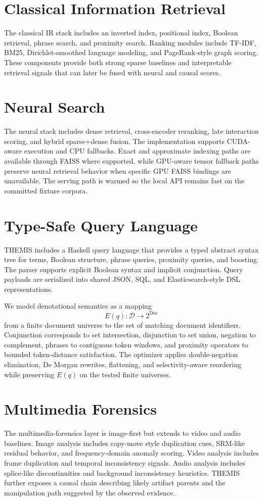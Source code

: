 \documentclass{article}
\begin{document}
\section{Classical Information Retrieval}
The classical IR stack includes an inverted index, positional index, Boolean retrieval, phrase search, and proximity search. Ranking modules include TF-IDF, BM25, Dirichlet-smoothed language modeling, and PageRank-style graph scoring. These components provide both strong sparse baselines and interpretable retrieval signals that can later be fused with neural and causal scores.

\section{Neural Search}
The neural stack includes dense retrieval, cross-encoder reranking, late interaction scoring, and hybrid sparse+dense fusion. The implementation supports CUDA-aware execution and CPU fallbacks. Exact and approximate indexing paths are available through FAISS where supported, while GPU-aware tensor fallback paths preserve neural retrieval behavior when specific GPU FAISS bindings are unavailable. The serving path is warmed so the local API remains fast on the committed fixture corpora.

\section{Type-Safe Query Language}
THEMIS includes a Haskell query language that provides a typed abstract syntax tree for terms, Boolean structure, phrase queries, proximity queries, and boosting. The parser supports explicit Boolean syntax and implicit conjunction. Query payloads are serialized into shared JSON, SQL, and Elasticsearch-style DSL representations.

We model denotational semantics as a mapping
\[
E(q) : \mathcal{D} \rightarrow 2^{\mathrm{Doc}}
\]
from a finite document universe to the set of matching document identifiers. Conjunction corresponds to set intersection, disjunction to set union, negation to complement, phrases to contiguous token windows, and proximity operators to bounded token-distance satisfaction. The optimizer applies double-negation elimination, De Morgan rewrites, flattening, and selectivity-aware reordering while preserving $E(q)$ on the tested finite universes.

\section{Multimedia Forensics}
The multimedia-forensics layer is image-first but extends to video and audio baselines. Image analysis includes copy-move style duplication cues, SRM-like residual behavior, and frequency-domain anomaly scoring. Video analysis includes frame duplication and temporal inconsistency signals. Audio analysis includes splice-like discontinuities and background inconsistency heuristics. THEMIS further exposes a causal chain describing likely artifact parents and the manipulation path suggested by the observed evidence.
\end{document}
